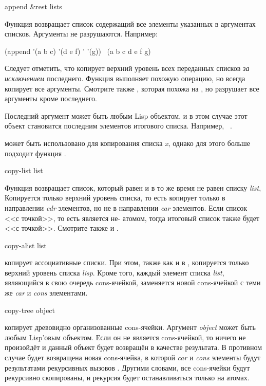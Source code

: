 \begin{defun}[Функция]
append &rest lists

Функция возвращает список содержащий все элементы указанных в аргументах списков.
Аргументы не разрушаются.
Например:
\begin{lisp}
(append '(a b c) '(d e f) '{\emptylist} '(g)) \EV\ (a b c d e f g)
\end{lisp}
Следует отметить, что  копирует верхний уровень всех переданных
списков \emph{за исключением} последнего.
Функция  выполняет похожую операцию, но всегда копирует все
аргументы. Смотрите также , которая похожа на , но
разрушает все аргументы кроме последнего.

Последний аргумент может быть любым Lisp объектом, и в этом случае этот объект
становится последним элементов итогового списка.
Например,  \EV\ .

 может быть использовано для копирования
списка \emph{x}, однако для этого больше подходит функция .
\end{defun}

\begin{defun}[Функция]
copy-list list

Функция возвращает список, который равен  и в то же время не равен
 списку \emph{list}, 
Копируется только верхний уровень списка, то есть  копирует
только в направлении \emph{cdr} элементов, но не в направлении \emph{car}
элементов.
Если список <<с точкой>>, то есть  является
не-{\nil} атомом, тогда итоговый список также будет <<с точкой>>.
Смотрите также  и .
\end{defun}

\begin{defun}[Функция]
copy-alist list

 копирует ассоциативные списки. При этом, также как и в
, копируется только верхний уровень списка \emph{lisp}.
Кроме того, каждый элемент списка \emph{list}, являющийся в свою очередь
cons-ячейкой, заменяется новой cons-ячейкой с теми же \emph{car} и \emph{cons}
элементами.
\end{defun}

\begin{defun}[Функция]
copy-tree object

 копирует древовидно организованные cons-ячейки.
Аргумент \emph{object} может быть любым Lisp'овым объектом.
Если он не является cons-ячейкой, то ничего не произойдёт и данный объект будет
возвращён в качестве результата. В противном случае будет возвращена новая
cons-ячейка, в которой \emph{car} и \emph{cons} элементы будут результатами
рекурсивных вызовов . Другими словами, все cons-ячейки будут
рекурсивно скопированы, и рекурсия будет останавливаться только на атомах.
\end{defun}

